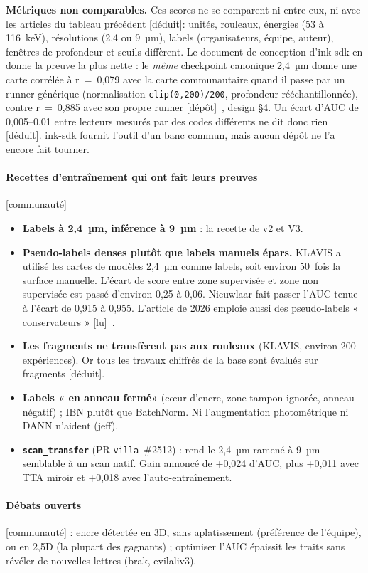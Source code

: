 \documentclass[11pt,a4paper]{article}
\newcommand{\lu}{\textsf{\small[lu]}}
\newcommand{\deduit}{\textsf{\small[déduit]}}
\newcommand{\commu}{\textsf{\small[communauté]}}
\newcommand{\depot}{\textsf{\small[dépôt]}}
\begin{document}
\noindent \textbf{Métriques non comparables.} Ces scores ne se comparent ni entre eux, ni
avec les articles du tableau précédent \deduit : unités, rouleaux, énergies (53 à 116~keV),
résolutions (2,4 ou 9~µm), labels (organisateurs, équipe, auteur), fenêtres de profondeur et
seuils diffèrent. Le document de conception d'ink-sdk en donne la preuve la plus nette : le
\emph{même} checkpoint canonique 2,4~µm donne une carte corrélée à r~=~0,079 avec la carte
communautaire quand il passe par un runner générique (normalisation \texttt{clip(0,200)/200},
profondeur rééchantillonnée), contre r~=~0,885 avec son propre runner \depot~\cite{limegs2026sdk},
design §4. Un écart d'AUC de 0,005–0,01 entre lecteurs mesurés par des codes différents ne
dit donc rien \deduit. ink-sdk fournit l'outil d'un banc commun, mais aucun dépôt ne l'a
encore fait tourner.

\paragraph{Recettes d'entraînement qui ont fait leurs preuves} \commu
\begin{itemize}
  \item \textbf{Labels à 2,4~µm, inférence à 9~µm} : la recette de v2 et V3.
  \item \textbf{Pseudo-labels denses plutôt que labels manuels épars.} KLAVIS a utilisé les
  cartes de modèles 2,4~µm comme labels, soit environ 50~fois la surface manuelle. L'écart de
  score entre zone supervisée et zone non supervisée est passé d'environ 0,25 à 0,06.
  Nieuwlaar fait passer l'AUC tenue à l'écart de 0,915 à 0,955. L'article de 2026 emploie aussi
  des pseudo-labels « conservateurs » \lu~\cite{angelotti2026complete}.
  \item \textbf{Les fragments ne transfèrent pas aux rouleaux} (KLAVIS, environ 200
  expériences). Or tous les travaux chiffrés de la base sont évalués sur fragments \deduit.
  \item \textbf{Labels « en anneau fermé»} (cœur d'encre, zone tampon ignorée, anneau
  négatif) ; IBN plutôt que BatchNorm. Ni l'augmentation photométrique ni DANN n'aident (jeff).
  \item \textbf{\texttt{scan\_transfer}} (PR \texttt{villa}~\#2512) : rend le 2,4~µm ramené à
  9~µm semblable à un scan natif. Gain annoncé de +0,024 d'AUC, plus +0,011 avec TTA miroir
  et +0,018 avec l'auto-entraînement.
\end{itemize}

\paragraph{Débats ouverts} \commu{} : encre détectée en 3D, sans aplatissement (préférence de
l'équipe), ou en 2,5D (la plupart des gagnants) ; optimiser l'AUC épaissit les traits sans
révéler de nouvelles lettres (brak, evilaliv3).
\end{document}
